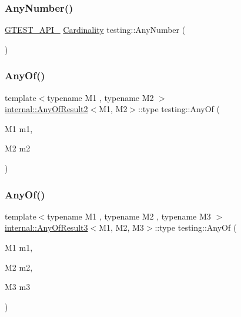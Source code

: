 \subsubsection{\texorpdfstring{Any\+Number()}{AnyNumber()}}
{\footnotesize\ttfamily \hyperlink{gtest-port_8h_aa73be6f0ba4a7456180a94904ce17790}{G\+T\+E\+S\+T\+\_\+\+A\+P\+I\+\_\+} \hyperlink{classtesting_1_1_cardinality}{Cardinality} testing\+::\+Any\+Number (\begin{DoxyParamCaption}{ }\end{DoxyParamCaption})}

\mbox{\label{namespacetesting_a81cfefd9f75cdce827d5bc873cf73aac}} 
\subsubsection{\texorpdfstring{Any\+Of()}{AnyOf()}\hspace{0.1cm}{\footnotesize\ttfamily [1/9]}}
{\footnotesize\ttfamily template$<$typename M1 , typename M2 $>$ \\
\hyperlink{structtesting_1_1internal_1_1_any_of_result2}{internal\+::\+Any\+Of\+Result2}$<$M1, M2$>$\+::type testing\+::\+Any\+Of (\begin{DoxyParamCaption}\item[{M1}]{m1,  }\item[{M2}]{m2 }\end{DoxyParamCaption})\hspace{0.3cm}{\ttfamily [inline]}}

\mbox{\label{namespacetesting_a3ccbde3ba01189587676d44a4333c0a5}} 
\subsubsection{\texorpdfstring{Any\+Of()}{AnyOf()}\hspace{0.1cm}{\footnotesize\ttfamily [2/9]}}
{\footnotesize\ttfamily template$<$typename M1 , typename M2 , typename M3 $>$ \\
\hyperlink{structtesting_1_1internal_1_1_any_of_result3}{internal\+::\+Any\+Of\+Result3}$<$M1, M2, M3$>$\+::type testing\+::\+Any\+Of (\begin{DoxyParamCaption}\item[{M1}]{m1,  }\item[{M2}]{m2,  }\item[{M3}]{m3 }\end{DoxyParamCaption})\hspace{0.3cm}{\ttfamily [inline]}}


